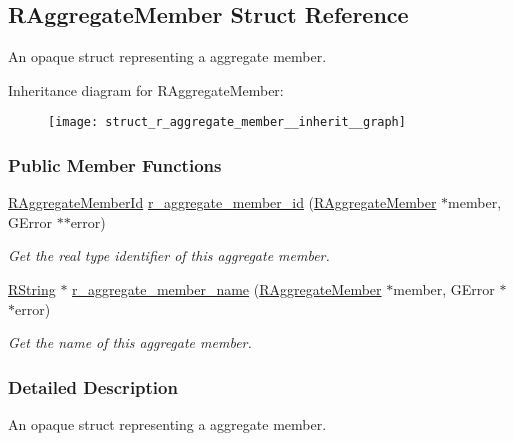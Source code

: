 \hypertarget{struct_r_aggregate_member}{\subsection{R\-Aggregate\-Member Struct Reference}
\label{struct_r_aggregate_member}
}


An opaque struct representing a aggregate member.  




Inheritance diagram for R\-Aggregate\-Member\-:\nopagebreak
\begin{figure}[H]
\begin{center}
\leavevmode
\texttt{[image: struct\_r\_aggregate\_member\_\_inherit\_\_graph]}
\end{center}
\end{figure}
\subsubsection*{Public Member Functions}
\begin{DoxyCompactItemize}
\item 
\hyperlink{aggregate__member_8h_ae66a822b4bce9e1559fef33422de505c}{R\-Aggregate\-Member\-Id} \hyperlink{struct_r_aggregate_member_a3d8b736967820633c1fcd3c91958cdea}{r\-\_\-aggregate\-\_\-member\-\_\-id} (\hyperlink{struct_r_aggregate_member}{R\-Aggregate\-Member} $\ast$member, G\-Error $\ast$$\ast$error)
\begin{DoxyCompactList}\small\item\em Get the real type identifier of this aggregate member. \end{DoxyCompactList}\item 
\hyperlink{struct_r_string}{R\-String} $\ast$ \hyperlink{struct_r_aggregate_member_a48fc0de0e9dc5bfba78304194536c919}{r\-\_\-aggregate\-\_\-member\-\_\-name} (\hyperlink{struct_r_aggregate_member}{R\-Aggregate\-Member} $\ast$member, G\-Error $\ast$$\ast$error)
\begin{DoxyCompactList}\small\item\em Get the name of this aggregate member. \end{DoxyCompactList}\end{DoxyCompactItemize}


\subsubsection{Detailed Description}
An opaque struct representing a aggregate member. 

